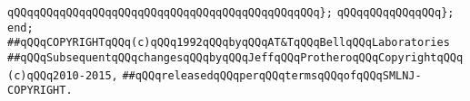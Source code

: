 \verb|qQQqqQQqqQQqqQQqqQQqqQQqqQQqqQQqqQQqqQQqqQQqqQQq};|\newline
\verb|qQQqqQQqqQQqqQQq};|\newline
\verb|end;|\newline
\newline
\newline
\verb|##qQQqCOPYRIGHTqQQq(c)qQQq1992qQQqbyqQQqAT&TqQQqBellqQQqLaboratories|\newline
\verb|##qQQqSubsequentqQQqchangesqQQqbyqQQqJeffqQQqProtheroqQQqCopyrightqQQq(c)qQQq2010-2015,|\newline
\verb|##qQQqreleasedqQQqperqQQqtermsqQQqofqQQqSMLNJ-COPYRIGHT.|\newline

